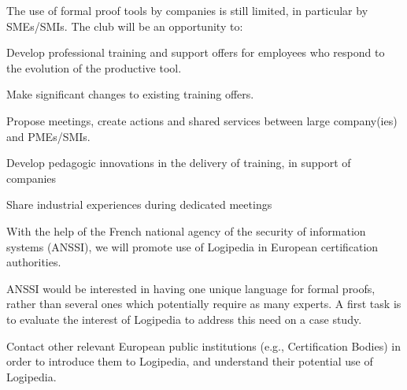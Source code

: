 \begin{workpackage}[id=dissemination,type=MGT,
  short={Dissemination},
  title={Dissemination, communication and exploitation},
  lead=Inr,InrRM=12,BirRM=4,IrtRM=4,ImtRM=2,StrRM=2,ZibRM=14,EduRM=12]
\begin{tasklist}
  \begin{task}[id=industrial-club,
    title=Expanding the use of Logipedia in the industry,
    lead=Irt,IrtRM=2,wphases=7-42!.1]
    The use of formal proof tools by companies is still limited, in particular by SMEs/SMIs. The club will be an opportunity to:
    \begin{compactitem}
    \item Develop professional training and support offers for employees who respond to the evolution of the productive tool.
    \item Make significant changes to existing training offers.
    \item Propose meetings, create actions and shared services between large company(ies) and PMEs/SMIs.
    \item Develop pedagogic innovations in the delivery of training, in support of companies
    \item Share industrial experiences during dedicated meetings
    \end{compactitem}
  \end{task}

  \begin{task}[id=certifiers-club,
      title=Promoting the use of Logipedia by certification
      authorities, lead=Imt,ImtRM=2,wphases=7-42!.05]

    With the help of the French national agency of the security of
    information systems (ANSSI), we will promote use of Logipedia in
    European certification authorities.
    
    \begin{compactitem}
    \item  ANSSI would be interested in having one unique language for formal
proofs, rather than several ones which potentially require as many
experts. A first task is to evaluate the interest of Logipedia to address
this need on a case study. 
\item Contact other relevant European public institutions
(e.g., Certification Bodies) in order to introduce them to Logipedia,
and understand their potential use of Logipedia. 
    \end{compactitem}
  \end{task}


\end{tasklist}
\end{workpackage}
